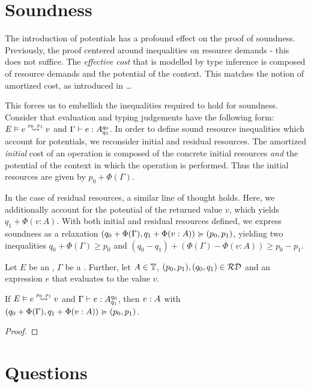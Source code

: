 \section{Soundness}\label{sec:soundness-6}

The introduction of potentials has a profound effect on the proof of soundness. Previously, the proof centered around inequalities on resource demands - this does not suffice. The \emph{effective cost} that is modelled by type inference is composed of resource demands and the potential of the context. This matches the notion of amortized cost, as introduced in \dots
{}

This forces us to embellish the inequalities required to hold for soundness. Consider that evaluation and typing judgements have the following form:  \(\evals{E}{e}{v}{p_0}{p_1}\) and \(\Gamma \vdash e : A ^{q_0}_{q_1}\). In order to define sound resource inequalities which account for potentials, we reconsider initial and residual resources. The amortized \emph{initial} cost of an operation is composed of the concrete initial resources \emph{and} the potential of the context in which the operation is performed. Thus the initial resources are given by \(p_0 + \Phi(\Gamma)\). 

In the case of residual resources, a similar line of thought holds. Here, we additionally account for the potential of the returned value \(v\), which yields \(q_1 + \Phi(v : A)\). With both initial and residual resources defined, we express soundness as a relaxation \((q_0 + \Phi(\Gamma), q_1 + \Phi(v : A)) \succcurlyeq (p_0, p_1)\), yielding two inequalities \(q_0 + \Phi(\Gamma) \geq p_0\) and \((q_0 - q_1) + (\Phi(\Gamma) - \Phi(v : A)) \geq p_0 - p_1\).



\begin{theorem}\label{thm:soundness-5}
   Let \(E\) be an , \(\Gamma\) be a . Further, let \(A \in \mathbb{T}\), \((p_0, p_1), (q_0, q_1) \in \mathcal{RD}\) and an expression \(e\) that evaluates to the value \(v\). 

   \begin{center}
   If \(\evals{E}{e}{v}{p_0}{p_1}\) and \(\Gamma \vdash e : A ^{q_0}_{q_1}\), then \(v : A ^{}_{}\) with \((q_0 + \Phi(\Gamma), q_1 + \Phi(v : A)) \succcurlyeq (p_0, p_1)\).
   \end{center}
\end{theorem}

\begin{proof}
\end{proof}
 
\section{Questions}

